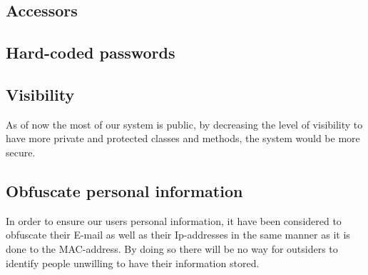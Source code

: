 \subsection*{Accessors}
\subsection*{Hard-coded passwords}

\subsection*{Visibility}
As of now the most of our system is public, by decreasing the level of visibility to have more private and protected classes and methods, the system would be more secure.
 
\subsection*{Obfuscate personal information}
In order to ensure our users personal information, it have been considered to obfuscate their E-mail as well as their Ip-addresses in the same manner as it is done to the MAC-address. By doing so there will be no way for outsiders to identify people unwilling to have their information stored.
